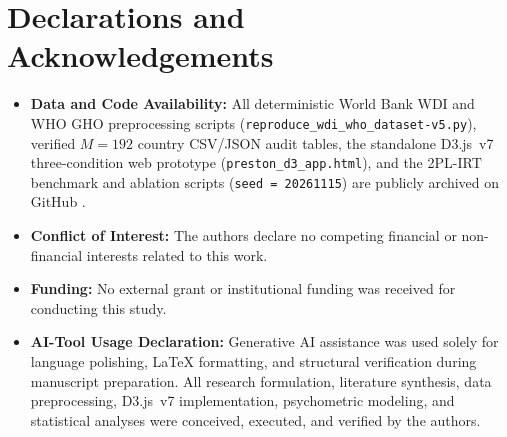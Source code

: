 \documentclass[conference]{IEEEtran}
\newcommand{\WdiM}{192}
\begin{document}
\section{Declarations and Acknowledgements}
\label{sec:declarations}
\begin{itemize}
\item \textbf{Data and Code Availability:} All deterministic World Bank WDI and WHO GHO preprocessing scripts (\texttt{reproduce\_wdi\_who\_dataset-v5.py}), verified $M = \WdiM$ country CSV/JSON audit tables, the standalone D3.js~v7 three-condition web prototype (\texttt{preston\_d3\_app.html}), and the 2PL-IRT benchmark and ablation scripts (\texttt{seed = 20261115}) are publicly archived on GitHub \cite{repo}.
\item \textbf{Conflict of Interest:} The authors declare no competing financial or non-financial interests related to this work.
\item \textbf{Funding:} No external grant or institutional funding was received for conducting this study.
\item \textbf{AI-Tool Usage Declaration:} Generative AI assistance was used solely for language polishing, LaTeX formatting, and structural verification during manuscript preparation. All research formulation, literature synthesis, data preprocessing, D3.js~v7 implementation, psychometric modeling, and statistical analyses were conceived, executed, and verified by the authors.
\end{itemize}
\end{document}
